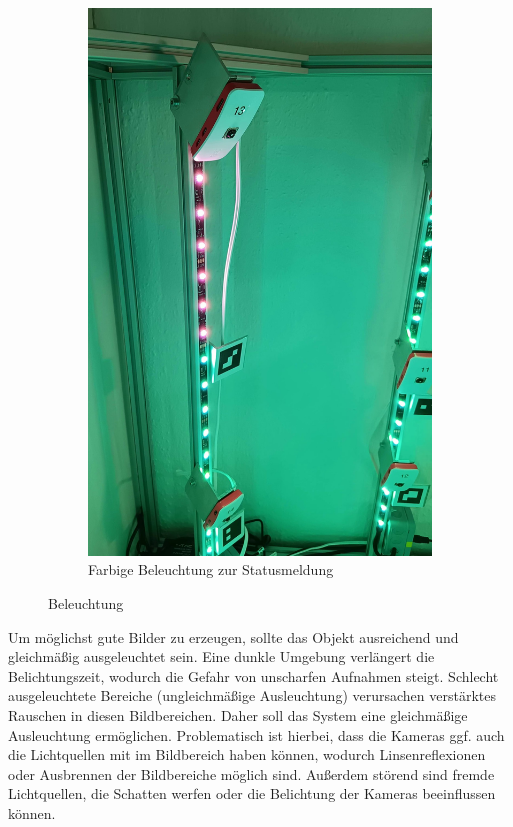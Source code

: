 \documentclass[./00PhotoBox.tex]{subfiles}
\begin{document}
\begin{figure}
\begin{subfigure}{0.45\textwidth}
        \includegraphics[height=1.2\linewidth]{./img/beleuchtung_farbig.jpg}
        \centering
        \caption{Farbige Beleuchtung zur Statusmeldung} %
        \label{img:led_farbig} %
    \end{subfigure}
    \caption{Beleuchtung} %
\end{figure}

Um möglichst gute Bilder zu erzeugen, sollte das Objekt ausreichend und gleichmäßig ausgeleuchtet sein. Eine dunkle Umgebung verlängert die Belichtungszeit, wodurch die Gefahr von unscharfen Aufnahmen steigt. Schlecht ausgeleuchtete Bereiche (ungleichmäßige Ausleuchtung) verursachen verstärktes Rauschen in diesen Bildbereichen. Daher soll das System eine gleichmäßige Ausleuchtung ermöglichen. Problematisch ist hierbei, dass die Kameras ggf. auch die Lichtquellen mit im Bildbereich haben können, wodurch Linsenreflexionen oder Ausbrennen der Bildbereiche möglich sind. Außerdem störend sind fremde Lichtquellen, die Schatten werfen oder die Belichtung der Kameras beeinflussen können.
\end{document}
